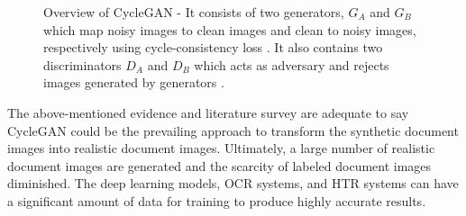 \begin{figure}[!htbp]
        \begin{center}
	    \caption[Overview of CycleGAN.]{Overview of \ac{CycleGAN} - It consists of two generators, $G_A$ and $G_B$ which map noisy images to clean images and clean to noisy images, respectively using cycle-consistency loss \cite{zhu2020unpaired}. It also contains two discriminators $D_A$ and $D_B$ which acts as adversary and rejects images generated by generators \cite{sharma2019learning}.}
	    \label{fig:LearningToClean}
	    \end{center}
\end{figure}




The above-mentioned evidence and literature survey are adequate to say \ac{CycleGAN} could be the prevailing approach to transform the synthetic document images into realistic document images. Ultimately, a large number of realistic document images are generated and the scarcity of labeled document images diminished. The deep learning models, \ac{OCR} systems, and \ac{HTR} systems can have a significant amount of data for training to produce highly accurate results.









































